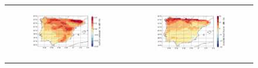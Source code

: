 \begin{figure}[htbp]
\begin{tabular}{cc}
        \begin{subfigure}[b]{0.5\textwidth}
            \caption{}
            \includegraphics[width=\textwidth]{images/chap4/future/reldiffmap_psol_presfut.png}
        \end{subfigure} &
        \begin{subfigure}[b]{0.5\textwidth}
            \caption{}
            \includegraphics[width=\textwidth]{images/chap4/future/reldiffmap_fluxsens_presfut.png}
        \end{subfigure} \\


\end{tabular}
\end{figure}
